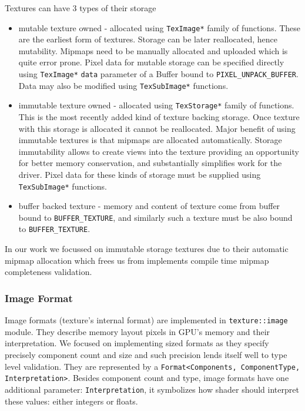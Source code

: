 Textures can have 3 types of their storage
\begin{itemize}
    \item mutable texture owned - allocated using \texttt{TexImage*} family of functions. 
        These are the earliest form of textures. Storage can be later reallocated, hence mutability. 
        Mipmaps need to be manually allocated and uploaded which is quite error prone.
        Pixel data for mutable storage can be specified directly using 
        \texttt{TexImage*} \texttt{data} parameter of a Buffer bound to \texttt{PIXEL\_UNPACK\_BUFFER}.
        Data may also be modified using \texttt{TexSubImage*} functions.
    \item immutable texture owned - allocated using \texttt{TexStorage*} family of functions. 
        This is the most recently added kind of texture backing storage. 
        Once texture with this storage is allocated it cannot be reallocated. 
        Major benefit of using immutable textures is that mipmaps are allocated automatically. 
        Storage immutability allows to create views into the texture providing 
        an opportunity for better memory conservation, and substantially simplifies work for the driver.
        Pixel data for these kinds of storage must be supplied using \texttt{TexSubImage*} functions.
    \item buffer backed texture - memory and content of texture come from buffer bound to \texttt{BUFFER\_TEXTURE},
        and similarly such a texture must be also bound to \texttt{BUFFER\_TEXTURE}.
\end{itemize}

In our work we focussed on immutable storage textures due to their automatic mipmap allocation which frees us from 
implements compile time mipmap completeness validation.

\subsubsection{Image Format}

Image formats (texture's internal format) are implemented in \texttt{texture::image} module.
They describe memory layout pixels in GPU's memory and their interpretation.
We focused on implementing sized formats as they specify precisely component count and size 
and such precision lends itself well to type level validation.
They are represented by a \texttt{Format<Components, ComponentType, Interpretation>}.
Besides component count and type, image formats have one additional parameter: \texttt{Interpretation},
it symbolizes how shader should interpret these values: either integers or floats.

